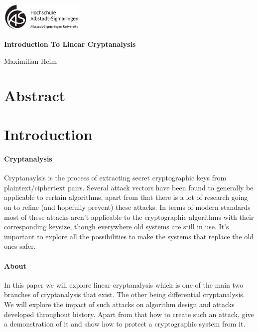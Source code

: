 \documentclass[11pt,a4paper]{article}
\begin{document}
\begin{titlepage}
    \begin{center}
        \includegraphics[width=0.3\textwidth]{logo.png}

        \vspace{20pt}

        \textbf{Introduction To Linear Cryptanalysis}

        \vspace{10pt}

        \small Maximilian Heim
    \end{center}
\end{titlepage}
\newpage
\tableofcontents
\newpage
\begin{multicols}{2}
\section{Abstract}
\section{Introduction}
\paragraph{Cryptanalysis}
Cryptanaylsis is the process of extracting secret cryptographic keys from plaintext/ciphertext pairs. Several attack vectors have been found to generally be applicable to certain algorithms, apart from that there is a lot of research going on to refine (and hopefully prevent) these attacks. In terms of modern standards most of these attacks aren't applicable to the cryptographic algorithms with their corresponding keysize, though everywhere old systems are still in use. It's important to explore all the possibilities to make the systems that replace the old ones safer.
\paragraph{About}
In this paper we will explore linear cryptanalysis which is one of the main two branches of cryptanalysis that exist. The other being differential cryptanalysis. We will explore the impact of such attacks on algorithm design and attacks developed throughout history. Apart from that how to create such an attack, give a demonstration of it and show how to protect a cryptographic system from it.
\end{multicols}
\end{document}
